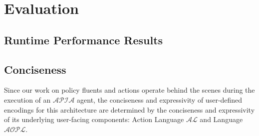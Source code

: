 \chapter{Evaluation}

%
%
%
%
%
%

\section{Runtime Performance Results}

\section{Conciseness}

Since our work on policy fluents and actions operate behind the scenes during the execution of an $\mathcal{APIA}$ agent, the conciseness and expressivity of user-defined encodings for this architecture are determined by the conciseness and expressivity of its underlying user-facing components: Action Language $\mathcal{AL}$ and Language $\mathcal{AOPL}$.

